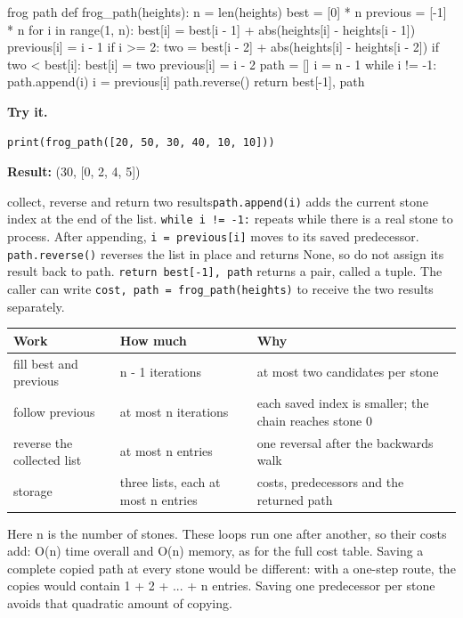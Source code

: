 \documentclass[11pt,a4paper,oneside]{report}
\begin{document}
\begin{bookcode}{frog path}
def frog_path(heights):
    n = len(heights)
    best = [0] * n
    previous = [-1] * n
    for i in range(1, n):
        best[i] = best[i - 1] + abs(heights[i] - heights[i - 1])
        previous[i] = i - 1
        if i >= 2:
            two = best[i - 2] + abs(heights[i] - heights[i - 2])
            if two < best[i]:
                best[i] = two
                previous[i] = i - 2
    path = []
    i = n - 1
    while i != -1:
        path.append(i)
        i = previous[i]
    path.reverse()
    return best[-1], path
\end{bookcode}
\textbf{Try it.}

\begin{lstlisting}
print(frog_path([20, 50, 30, 40, 10, 10]))
\end{lstlisting}
\textbf{Result:} (30, [0, 2, 4, 5])

\begin{pythonnote}{collect, reverse and return two results}\texttt{path.append(i)} adds the current stone index at the end of the list. \texttt{while i != -1:} repeats while there is a real stone to process. After appending, \texttt{i = previous[i]} moves to its saved predecessor. \texttt{path.reverse()} reverses the list in place and returns None, so do not assign its result back to path. \texttt{return best[-1], path} returns a pair, called a tuple. The caller can write \texttt{cost, path = frog\_path(heights)} to receive the two results separately.\end{pythonnote}
\par\medskip\begingroup\small\setlength{\tabcolsep}{4pt}\renewcommand{\arraystretch}{1.3}\begin{tabularx}{\linewidth}{>{\raggedright\arraybackslash}X>{\raggedright\arraybackslash}X>{\raggedright\arraybackslash}X}\toprule\textbf{Work} & \textbf{How much} & \textbf{Why}\\\midrule
{}fill best and previous & n - 1 iterations & at most two candidates per stone\\
{}follow previous & at most n iterations & each saved index is smaller; the chain reaches stone 0\\
{}reverse the collected list & at most n entries & one reversal after the backwards walk\\
{}storage & three lists, each at most n entries & costs, predecessors and the returned path\\
\bottomrule\end{tabularx}\endgroup\par\medskip
Here n is the number of stones. These loops run one after another, so their costs add: O(n) time overall and O(n) memory, as for the full cost table. Saving a complete copied path at every stone would be different: with a one-step route, the copies would contain 1 + 2 + ... + n entries. Saving one predecessor per stone avoids that quadratic amount of copying.
\end{document}
